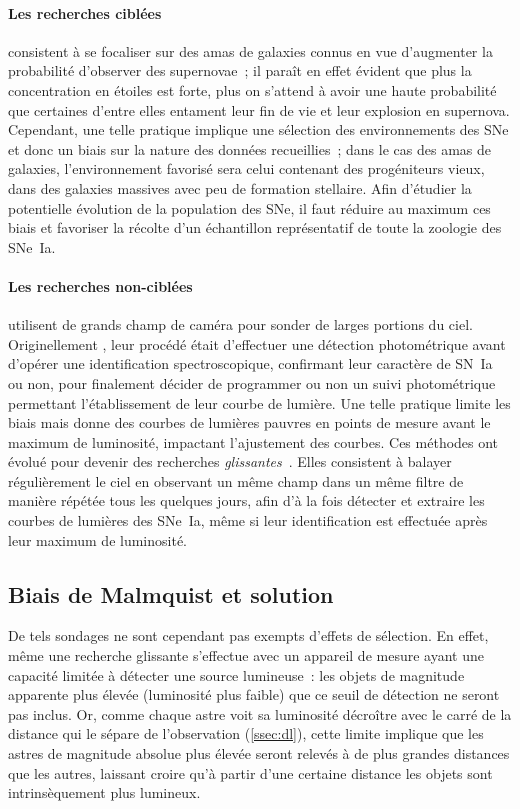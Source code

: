 \documentclass[../main/main.tex]{subfiles}
\begin{document}
\paragraph*{Les recherches ciblées} consistent à se focaliser sur des amas de
galaxies connus en vue d'augmenter la probabilité d'observer des supernovae~; il
paraît en effet évident que plus la concentration en étoiles est forte, plus on
s'attend à avoir une haute probabilité que certaines d'entre elles entament leur
fin de vie et leur explosion en supernova. Cependant, une telle pratique
implique une sélection des environnements des SNe et donc un biais sur la nature
des données recueillies~; dans le cas des amas de galaxies, l'environnement
favorisé sera celui contenant des progéniteurs vieux, dans des galaxies massives
avec peu de formation stellaire. Afin d'étudier la potentielle évolution de la
population des SNe, il faut réduire au maximum ces biais et favoriser la récolte
d'un échantillon représentatif de toute la zoologie des SNe~Ia.

\paragraph*{Les recherches non-ciblées} utilisent de grands champ de caméra pour
sonder de larges portions du ciel. Originellement
\citep[SCP,][]{perlmutter1999}, leur procédé était d'effectuer une
détection photométrique avant d'opérer une identification spectroscopique,
confirmant leur caractère de SN~Ia ou non, pour finalement décider de programmer
ou non un suivi photométrique permettant l'établissement de leur courbe de
lumière. Une telle pratique limite les biais mais donne des courbes de lumières
pauvres en points de mesure avant le maximum de luminosité, impactant
l'ajustement des courbes. Ces méthodes ont évolué pour devenir des recherches
\textit{glissantes}~\citep{astier2006}. Elles consistent à balayer régulièrement
le ciel en observant un même champ dans un même filtre de manière répétée tous
les quelques jours, afin d'à la fois détecter et extraire les courbes de
lumières des SNe~Ia, même si leur identification est effectuée après leur
maximum de luminosité.

\subsection{Biais de Malmquist et solution}\label{ssec:malm}

De tels sondages ne sont cependant pas exempts d'effets de sélection. En effet,
même une recherche glissante s'effectue avec un appareil de mesure ayant une
capacité limitée à détecter une source lumineuse~: les objets de magnitude
apparente plus élevée (luminosité plus faible) que ce seuil de détection ne
seront pas inclus. Or, comme chaque astre voit sa luminosité décroître avec le
carré de la distance qui le sépare de l'observation (\ref{ssec:dl}), cette
limite implique que les astres de magnitude absolue plus élevée seront relevés à
de plus grandes distances que les autres, laissant croire qu'à partir d'une
certaine distance les objets sont intrinsèquement plus lumineux.
\end{document}
